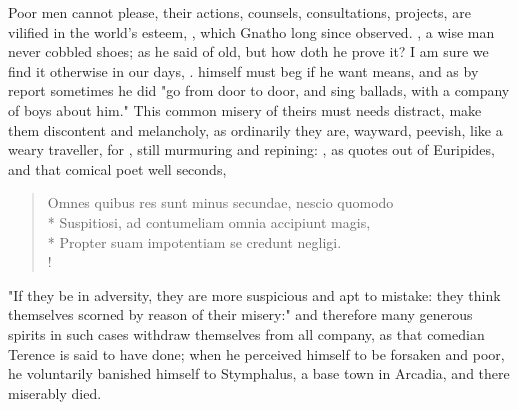 Poor men cannot please, their actions, counsels, consultations, projects, are
vilified in the world's esteem, , which Gnatho
long since observed. , a wise man never cobbled shoes; as he said of old, but how doth
he prove it? I am sure we find it otherwise in our days,
. \Homer{} himself must
beg if he want means, and as by report sometimes he did
"go from door to door, and sing ballads, with a company of
boys about him." This common misery of theirs must needs distract, make them
discontent and melancholy, as ordinarily they are, wayward, peevish, like a
weary traveller, for , still murmuring and repining: , as \Plutarch{} quotes out of Euripides, and that comical poet well seconds,

\begin{latin}
\begin{verse}%
Omnes quibus res sunt minus secundae, nescio quomodo\\*
Suspitiosi, ad contumeliam omnia accipiunt magis,\\*
Propter suam impotentiam se credunt negligi.\\!
\end{verse}%
\end{latin}

"If they be in adversity, they are more suspicious and apt to mistake: they
think themselves scorned by reason of their misery:" and therefore many
generous spirits in such cases withdraw themselves from all company, as that
comedian Terence is said to have done; when he perceived
himself to be forsaken and poor, he voluntarily banished himself to Stymphalus,
a base town in Arcadia, and there miserably died.



